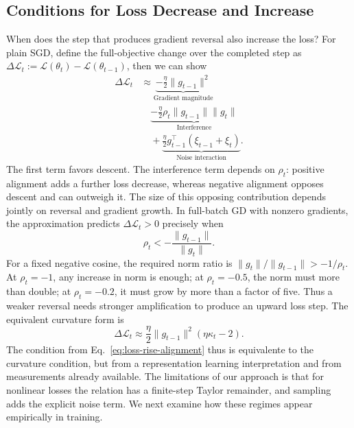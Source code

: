 \subsection{Conditions for Loss Decrease and Increase}
\label{subsec:loss-connection}\label{subsec:loss}

When does the step that produces gradient reversal also increase the loss? For plain SGD, define the full-objective change over the completed step as $\Delta\mathcal L_t:=\mathcal L(\theta_t)-\mathcal L(\theta_{t-1})$, then we can show
\begin{equation}
\begin{aligned}
\Delta\mathcal L_t
&\approx\underbrace{-\frac{\eta}{2}\|g_{t-1}\|^2}_{\text{Gradient magnitude}}\\
&\quad\underbrace{-\frac{\eta}{2}\rho_t\|g_{t-1}\|\|g_t\|}_{\text{Interference}}\\
&\quad+\underbrace{\frac{\eta}{2}g_{t-1}^\top(\xi_{t-1}+\xi_t)}_{\text{Noise interaction}}.
\end{aligned}
\label{eq:loss-curvature}
\end{equation}
The first term favors descent. The interference term depends on $\rho_t$: positive alignment adds a further loss decrease, whereas negative alignment opposes descent and can outweigh it. The size of this opposing contribution depends jointly on reversal and gradient growth. In full-batch GD with nonzero gradients, the approximation predicts $\Delta\mathcal L_t>0$ precisely when
\begin{equation}
  \boxed{\rho_t<-\frac{\|g_{t-1}\|}{\|g_t\|}.}
  \label{eq:loss-rise-alignment}
\end{equation}
For a fixed negative cosine, the required norm ratio is $\|g_t\|/\|g_{t-1}\|>-1/\rho_t$. At $\rho_t=-1$, any increase in norm is enough; at $\rho_t=-0.5$, the norm must more than double; at $\rho_t=-0.2$, it must grow by more than a factor of five. Thus a weaker reversal needs stronger amplification to produce an upward loss step. The equivalent curvature form is
\begin{equation}
  \Delta\mathcal L_t\approx
  \frac{\eta}{2}\|g_{t-1}\|^2(\eta\kappa_t-2).
  \label{eq:loss-rise-curvature}
\end{equation}
The condition from Eq.~\ref{eq:loss-rise-alignment} thus is equivalente to the curvature condition, but from a representation learning interpretation and from measurements already available. The limitations of our approach is that for nonlinear losses the relation has a finite-step Taylor remainder, and sampling adds the explicit noise term. We next examine how these regimes appear empirically in training.